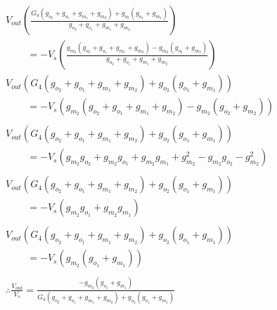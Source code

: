 \begin{enumerate}
\begin{align*}
      V_{out}\left(\frac{G_4(g_{o_2} + g_{o_1} + g_{m_1} + g_{m_2}) + g_{o_2}(g_{o_1} + g_{m_1})}{g_{o_2} + g_{o_1} + g_{m_1} + g_{m_2}}\right) \\ \qquad \, = -V_{s}\left(\frac{g_{m_2}(g_{o_2} + g_{o_1} + g_{m_1} + g_{m_2}) - g_{m_2}(g_{o_2} + g_{m_2})}{g_{o_2} + g_{o_1} + g_{m_1} + g_{m_2}}\right) \\
      V_{out}(G_4(g_{o_2} + g_{o_1} + g_{m_1} + g_{m_2}) + g_{o_2}(g_{o_1} + g_{m_1})) \\ \qquad \, = -V_{s}(g_{m_2}(g_{o_2} + g_{o_1} + g_{m_1} + g_{m_2}) - g_{m_2}(g_{o_2} + g_{m_2})) \\\\
      V_{out}(G_4(g_{o_2} + g_{o_1} + g_{m_1} + g_{m_2}) + g_{o_2}(g_{o_1} + g_{m_1})) \\ \qquad \, = -V_{s}(g_{m_2}g_{o_2} + g_{m_2}g_{o_1} + g_{m_2}g_{m_1} + g_{m_2}^2 - g_{m_2}g_{o_2} - g_{m_2}^2) \\\\
      V_{out}(G_4(g_{o_2} + g_{o_1} + g_{m_1} + g_{m_2}) + g_{o_2}(g_{o_1} + g_{m_1})) \\ \qquad \, = -V_{s}(g_{m_2}g_{o_1} + g_{m_2}g_{m_1}) \\\\
      V_{out}(G_4(g_{o_2} + g_{o_1} + g_{m_1} + g_{m_2}) + g_{o_2}(g_{o_1} + g_{m_1})) \\ \qquad \, = -V_{s}(g_{m_2}(g_{o_1} + g_{m_1})) \\\\
      \therefore \frac{V_{out}}{V_s} = \frac{-g_{m_2}(g_{o_1} + g_{m_1})}{G_4(g_{o_2} + g_{o_1} + g_{m_1} + g_{m_2}) + g_{o_2}(g_{o_1} + g_{m_1})} \tag{14}
    \end{align*}
\end{enumerate}

